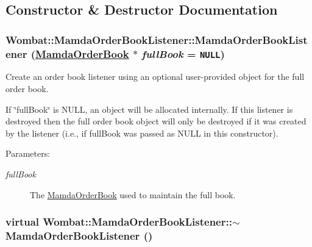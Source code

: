 \subsection{Constructor \& Destructor Documentation}
\hypertarget{classWombat_1_1MamdaOrderBookListener_bd475cc814e39d0ddfcec003cd46d7f1}{
\subsubsection[MamdaOrderBookListener]{\setlength{\rightskip}{0pt plus 5cm}Wombat::Mamda\-Order\-Book\-Listener::Mamda\-Order\-Book\-Listener (\hyperlink{classWombat_1_1MamdaOrderBook}{Mamda\-Order\-Book} $\ast$ {\em full\-Book} = {\tt NULL})}}
\label{classWombat_1_1MamdaOrderBookListener_bd475cc814e39d0ddfcec003cd46d7f1}


Create an order book listener using an optional user-provided object for the full order book. 

If \char`\"{}full\-Book\char`\"{} is NULL, an object will be allocated internally. If this listener is destroyed then the full order book object will only be destroyed if it was created by the listener (i.e., if full\-Book was passed as NULL in this constructor).

\begin{Desc}
\item[Parameters:]
\begin{description}
\item[{\em full\-Book}]The \hyperlink{classWombat_1_1MamdaOrderBook}{Mamda\-Order\-Book} used to maintain the full book. \end{description}
\end{Desc}
\hypertarget{classWombat_1_1MamdaOrderBookListener_519de32ed3343a70f54d313a0a86056b}{
\subsubsection[$\sim$MamdaOrderBookListener]{\setlength{\rightskip}{0pt plus 5cm}virtual Wombat::Mamda\-Order\-Book\-Listener::$\sim$Mamda\-Order\-Book\-Listener ()}}
\label{classWombat_1_1MamdaOrderBookListener_519de32ed3343a70f54d313a0a86056b}




